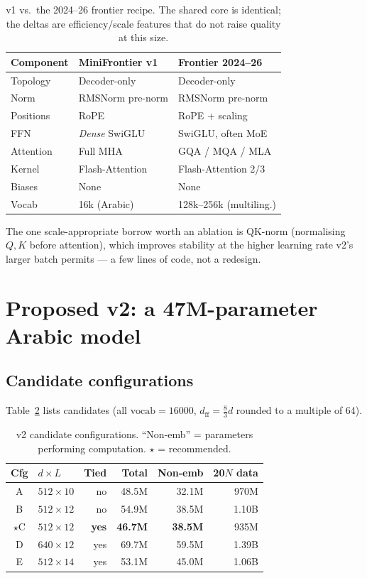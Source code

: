 \documentclass[10pt,twocolumn]{article}
\begin{document}
\begin{table}[h]
\centering\small
\caption{v1 vs.\ the 2024--26 frontier recipe. The shared core is identical; the
deltas are efficiency/scale features that do not raise quality at this size.}
\label{tab:frontier}
\begin{tabular}{@{}lll@{}}
\toprule
Component & MiniFrontier v1 & Frontier 2024--26 \\
\midrule
Topology      & Decoder-only        & Decoder-only \\
Norm          & RMSNorm pre-norm    & RMSNorm pre-norm \\
Positions     & RoPE                & RoPE + scaling \\
FFN           & \emph{Dense} SwiGLU & SwiGLU, often MoE \\
Attention     & Full MHA            & GQA / MQA / MLA \\
Kernel        & Flash-Attention     & Flash-Attention 2/3 \\
Biases        & None                & None \\
Vocab         & 16k (Arabic)        & 128k--256k (multiling.) \\
\bottomrule
\end{tabular}
\end{table}

\noindent The one scale-appropriate borrow worth an ablation is QK-norm
(normalising $Q,K$ before attention), which improves stability at the higher
learning rate v2's larger batch permits --- a few lines of code, not a redesign.

\section{Proposed v2: a 47M-parameter Arabic model}

\subsection{Candidate configurations}
Table~\ref{tab:v2} lists candidates (all $\text{vocab}{=}16000$,
$d_{\text{ff}}{=}\tfrac{8}{3}d$ rounded to a multiple of 64).

\begin{table}[t]
\centering
\small
\caption{v2 candidate configurations. ``Non-emb'' = parameters performing
computation. $\star$ = recommended.}
\label{tab:v2}
\begin{tabular}{@{}clrrrr@{}}
\toprule
Cfg & $d{\times}L$ & Tied & Total & Non-emb & 20$N$ data \\
\midrule
A & $512{\times}10$ & no  & 48.5M & 32.1M & 970M \\
B & $512{\times}12$ & no  & 54.9M & 38.5M & 1.10B \\
$\star$C & $512{\times}12$ & \textbf{yes} & \textbf{46.7M} & \textbf{38.5M} & 935M \\
D & $640{\times}12$ & yes & 69.7M & 59.5M & 1.39B \\
E & $512{\times}14$ & yes & 53.1M & 45.0M & 1.06B \\
\bottomrule
\end{tabular}
\end{table}
\end{document}
